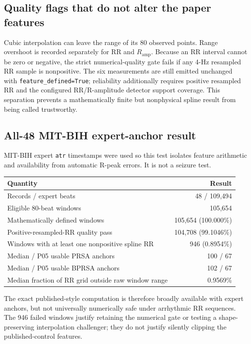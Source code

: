 \documentclass[11pt,a4paper]{article}
\begin{document}
\subsection{Quality flags that do not alter the paper features}

Cubic interpolation can leave the range of its 80 observed points. Range
overshoot is recorded separately for RR and $R_{\mathrm{amp}}$. Because an RR
interval cannot be zero or negative, the strict numerical-quality gate fails
if any 4-Hz resampled RR sample is nonpositive. The six measurements are still
emitted unchanged with \texttt{feature\_defined=True}; reliability additionally
requires positive resampled RR and the configured RR/R-amplitude detector
support coverage. This separation prevents a mathematically finite but
nonphysical spline result from being called trustworthy.

\subsection{All-48 MIT-BIH expert-anchor result}

MIT-BIH expert \texttt{atr} timestamps were used so this test isolates
feature arithmetic and availability from automatic R-peak errors. It is not a
seizure test.

\begin{center}
\begin{tabular}{lr}
\toprule
Quantity & Result \\
\midrule
Records / expert beats & 48 / 109,494 \\
Eligible 80-beat windows & 105,654 \\
Mathematically defined windows & 105,654 (100.000\%) \\
Positive-resampled-RR quality pass & 104,708 (99.1046\%) \\
Windows with at least one nonpositive spline RR & 946 (0.8954\%) \\
Median / P05 usable PRSA anchors & 100 / 67 \\
Median / P05 usable BPRSA anchors & 102 / 67 \\
Median fraction of RR grid outside raw window range & 0.9569\% \\
\bottomrule
\end{tabular}
\end{center}

The exact published-style computation is therefore broadly available with
expert anchors, but not universally numerically safe under arrhythmic RR
sequences. The 946 failed windows justify retaining the numerical gate or
testing a shape-preserving interpolation challenger; they do not justify
silently clipping the published-control features.
\end{document}
